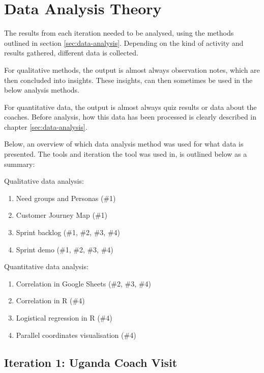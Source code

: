 \section{Data Analysis Theory}




The results from each iteration needed to be analysed, using the methods outlined in section \ref{sec:data-analysis}. Depending on the kind of activity and results gathered, different data is collected.

For qualitative methods, the output is almost always observation notes, which are then concluded into insights. These insights, can then sometimes be used in the below analysis methods.

For quantitative data, the output is almost always quiz results or data about the coaches. Before analysis, how this data has been processed is clearly described in chapter \ref{sec:data-analysis}.

Below, an overview of which data analysis method was used for what data is presented. The tools and iteration the tool was used in, is outlined below as a summary:

Qualitative data analysis:
\begin{enumerate}
\item Need groups and Personas (\#1)
\item Customer Journey Map (\#1)
\item Sprint backlog (\#1, \#2, \#3, \#4)
\item Sprint demo (\#1, \#2, \#3, \#4)
\end{enumerate}

Quantitative data analysis:
\begin{enumerate}
\item Correlation in Google Sheets (\#2, \#3, \#4)
\item Correlation in R (\#4)
\item Logistical regression in R (\#4)
\item Parallel coordinates visualisation (\#4)
\end{enumerate}

\subsection{Iteration 1: Uganda Coach Visit}

